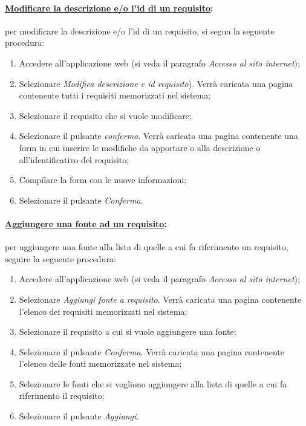 \paragraph{\underline{Modificare la descrizione e/o l'id di un requisito}:}
per modificare la descrizione e/o l'id di un requisito, si segua la seguente procedura:
\begin{enumerate}
\item Accedere all'applicazione web (si veda il paragrafo \textit{Accesso al sito internet});
\item Selezionare \textit{Modifica descrizione e id requisito}). Verrà caricata una pagina contenente tutti i requisiti memorizzati nel sistema;
\item Selezionare il requisito che si vuole modificare;
\item Selezionare il pulsante \textit{conferma}. Verrà caricata una pagina contenente una form in cui inserire le modifiche da apportare o alla descrizione o all'identificativo del requisito;
\item Compilare la form con le nuove informazioni;
\item Selezionare il pulsante \textit{Conferma}.
\end{enumerate}

\paragraph{\underline{Aggiungere una fonte ad un requisito}:}
per aggiungere una fonte alla lista di quelle a cui fa riferimento un requisito, seguire la seguente procedura:
\begin{enumerate}
\item Accedere all'applicazione web (si veda il paragrafo \textit{Accesso al sito internet});
\item Selezionare \textit{Aggiungi fonte a requisito}. Verrà caricata una pagina contenente l'elenco dei requisiti memorizzati nel sistema;
\item Selezionare il requisito a cui si vuole aggiungere una fonte;
\item Selezionare il pulsante \textit{Conferma}. Verrà caricata una pagina contenente l'elenco delle fonti memorizzate nel sistema;
\item Selezionare le fonti che si vogliono aggiungere alla lista di quelle a cui fa riferimento il requisito;
\item Selezionare il pulsante \textit{Aggiungi}.
\end{enumerate}

